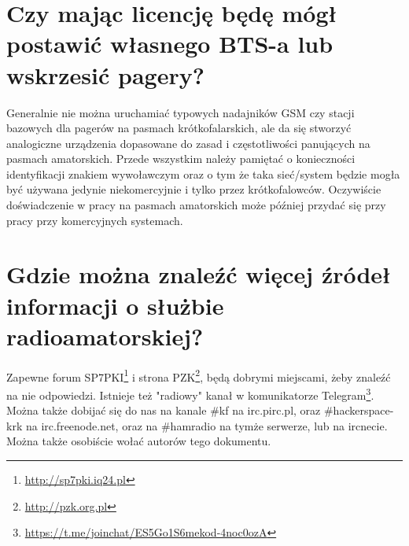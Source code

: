 \documentclass[a4paper,12pt]{article}
\begin{document}
\section{Czy mając licencję będę mógł postawić własnego BTS-a lub wskrzesić pagery?}
Generalnie nie można uruchamiać typowych nadajników GSM czy stacji bazowych dla pagerów na pasmach krótkofalarskich, ale da się stworzyć analogiczne urządzenia dopasowane do zasad i częstotliwości panujących na pasmach amatorskich. Przede wszystkim należy pamiętać o konieczności identyfikacji znakiem wywoławczym oraz o tym że taka sieć/system będzie mogła być używana jedynie niekomercyjnie i tylko przez krótkofalowców. Oczywiście doświadczenie w pracy na pasmach amatorskich może później przydać się przy pracy przy komercyjnych systemach.

\section{Gdzie można znaleźć więcej źródeł informacji o służbie radioamatorskiej?}
Zapewne forum SP7PKI\footnote{\url{http://sp7pki.iq24.pl}} i strona PZK\footnote{\url{http://pzk.org.pl}}, będą dobrymi miejscami, żeby znaleźć na nie odpowiedzi. Istnieje też "radiowy" kanał w komunikatorze Telegram\footnote{\url{https://t.me/joinchat/ES5Go1S6mekod-4noc0ozA}}. Można także dobijać się do nas na kanale \#kf na irc.pirc.pl, oraz \#hackerspace-krk na irc.freenode.net, oraz na \#hamradio na tymże serwerze, lub na ircnecie. Można także osobiście wołać autorów tego dokumentu.
\end{document}
